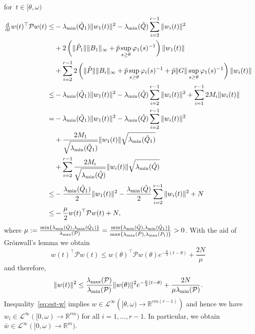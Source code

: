 \documentclass[ envcountsect, envcountsame]{svjour3}
\newcommand{\ddt}{\tfrac{\text{\normalfont d}}{\text{\normalfont d}t}}
\newcommand{\R}{\mathbb{R}}
\newcommand{\cL}{\mathcal{L}}
\newcommand{\cP}{\mathcal{P}}
\newcommand{\vp}{\varphi}
\begin{document}
for~$t \in [\theta,\omega)$ 
\begin{equation*}
\begin{aligned}
\ddt w(t)^\top \cP w(t) \le & 
- \lambda_{\rm min}(\hat Q_1) \|w_1(t)\|^2   
- \lambda_{\rm min}(\hat Q) \sum_{i=2}^{r-1} \|w_i(t)\|^2 \\
&  + 2 \left(\| \hat P_1\| \|B_1\|_\infty+\tilde p \sup_{s \ge \theta} \vp_1(s)^{-1} \right) \|w_1(t) \|  \\
&  + \sum_{i=2}^{r-1} 2 \left(\|\hat P\| \|B_i\|_\infty + \tilde p \sup_{s \ge \theta} \vp_i(s)^{-1} + \tilde p \|G\| \sup_{s \ge \theta} \vp_1(s)^{-1} \right) \|w_i(t)\| \\
%
\le & -  \lambda_{\rm min}(\hat Q_1) \|w_1(t)\|^2   - \lambda_{\rm min}(\hat Q) \sum_{i=2}^{r-1} \|w_i(t)\|^2 + \sum_{i=1}^{r-1} 2 M_i \|w_i(t)\|  \\
=& -  \lambda_{\rm min}(\hat Q_1) \|w_1(t)\|^2   - \lambda_{\rm min}(\hat Q) \sum_{i=2}^{r-1} \|w_i(t)\|^2 \\
& + \frac{ 2 M_1}{\sqrt{\lambda_{\rm min}(\hat Q_1)}} \|w_1(t)\| \sqrt{\lambda_{\rm min}(\hat Q_1)} \\
& + \sum_{i=2}^{r-1} \frac{2 M_i}{\sqrt{\lambda_{\rm min}(\hat Q)}} \|w_i(t)\| \sqrt{\lambda_{\rm min}(\hat Q)} \\
\le & -  \frac{\lambda_{\rm min}(\hat Q_1)}{2} \|w_1(t)\|^2   - \frac{\lambda_{\rm min}(\hat Q)}{2} \sum_{i=2}^{r-1} \|w_i(t)\|^2 + N \\
\le & - \frac{\mu}{2} w(t)^\top \cP w(t) + N ,
%
\end{aligned}
\end{equation*}
where $\mu := \tfrac{\min\{\lambda_{\rm min}(\hat Q), \lambda_{\rm min}(\hat Q_1)\}}{\lambda_{\rm max}(\cP)} =  \tfrac{\min\{\lambda_{\rm min}(\hat Q), \lambda_{\rm min}(\hat Q_1)\}}{\max\{\lambda_{\rm max}(\hat P),\lambda_{\rm max}(P_1)\}}> 0$. 
%
With the aid of Gr\"onwall's lemma we obtain %
\begin{equation*}
w(t)^\top \cP w(t) \le w(\theta)^\top \cP w(\theta) e^{-\frac{\mu}{2} (t-\theta)} + \frac{2N}{\mu} %
\end{equation*}
and therefore,
\begin{equation} \label{eq:est-w}
\|w(t)\|^2 \le \frac{\lambda_{\rm max}(\cP)}{\lambda_{\rm min}(\cP)} \|w(\theta)\|^2 e^{-\frac{\mu}{2} (t-\theta)} + \frac{2N}{\mu \lambda_{\rm min}(\cP)}.
\end{equation}
Inequality~\eqref{eq:est-w} implies $w \in \cL^\infty\left([\theta,\omega) \to \R^{rm(r-1)}\right)$ and hence we have
$w_i \in \cL^\infty([0,\omega) \to \R^{rm})$ for all $i=1,\ldots,r-1$. 
In particular, we obtain $\bar w \in \cL^\infty([0,\omega) \to \R^m)$. 
\end{document}
